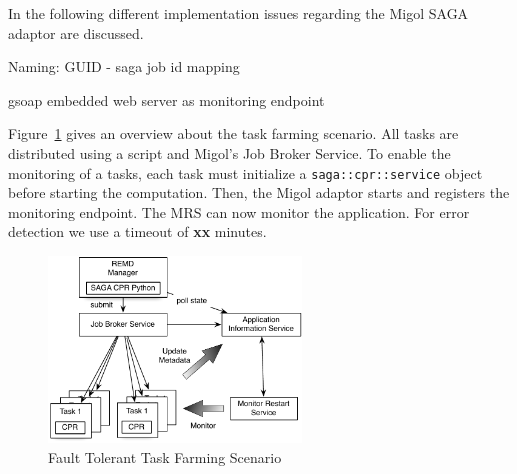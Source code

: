 \documentclass[times, 10pt,twocolumn]{article}
\begin{document}
In the following different implementation issues regarding the Migol SAGA adaptor are discussed.

\label{sec:saga_cpr_migol_adaptor}
                  
Naming: GUID - saga job id mapping

gsoap embedded web server as monitoring endpoint


\label{sec:exp}       

        
Figure~\ref{fig:saga-taskfarming} gives an overview about the task farming scenario. All tasks are
distributed using a script and Migol's Job Broker Service.
To enable the monitoring of a tasks, each task must initialize a \texttt{saga::cpr::service} object 
before starting the computation.  Then, the Migol adaptor starts and registers the monitoring endpoint. 
The MRS can now monitor the application.  For error detection we use a timeout of \textbf{xx} minutes.
\begin{figure}[t]
    \centering
        \includegraphics[width=0.6\textwidth]{saga-taskfarming}
    \caption{Fault Tolerant Task Farming Scenario}
    \label{fig:saga-taskfarming}
\end{figure} 
\end{document}
